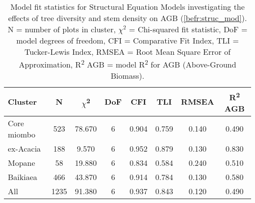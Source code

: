 \begin{table}[tb] 
	\caption[Model fit statistics per vegetation type]{Model fit statistics for Structural Equation Models investigating the effects of tree diversity and stem density on AGB (\autoref{befr:struc_mod}). N = number of plots in cluster, $\chi^{2}$ = Chi-squared fit statistic, DoF = model degrees of freedom, CFI = Comparative Fit Index, TLI = Tucker-Lewis Index, RMSEA = Root Mean Square Error of Approximation, R\textsuperscript{2} AGB = model R\textsuperscript{2} for AGB (Above-Ground Biomass).} 
	\label{befr:struc_model_fit_clust_stats} 
	\begin{tabular}{lS[table-format=3.2,table-column-width=0.5cm]SS[table-format=3.2,table-column-width=0.5cm]SSSS} 
\toprule
{Cluster} & {N} & {$\chi$\textsuperscript{2}} & {DoF} & {CFI} & {TLI} & {RMSEA} & {R\textsuperscript{2} AGB} \\
\midrule
Core miombo & 523 & 78.670 & 6 & 0.904 & 0.759 & 0.140 & 0.490 \\ 
ex-Acacia & 188 & 9.570 & 6 & 0.952 & 0.879 & 0.130 & 0.830 \\ 
Mopane & 58 & 19.880 & 6 & 0.834 & 0.584 & 0.240 & 0.510 \\ 
Baikiaea & 466 & 43.870 & 6 & 0.914 & 0.784 & 0.130 & 0.580 \\ 
All & 1235 & 91.380 & 6 & 0.937 & 0.843 & 0.120 & 0.490 \\ 
\bottomrule
\end{tabular} 
\end{table} 
